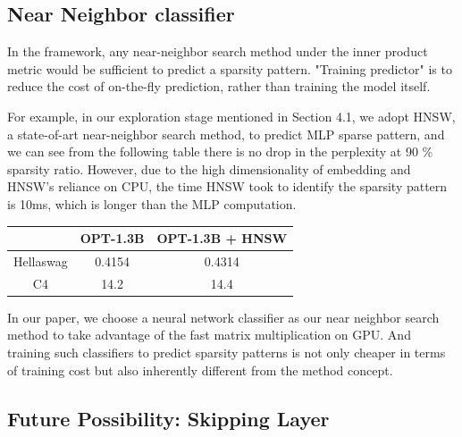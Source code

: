 \subsection{Near Neighbor classifier}
In the \name{} framework, any near-neighbor search method under the inner product metric would be sufficient to predict a sparsity pattern. "Training predictor" is to reduce the cost of on-the-fly prediction, rather than training the model itself.

For example, in our exploration stage mentioned in Section 4.1, we adopt HNSW, a state-of-art near-neighbor search method, to predict MLP sparse pattern, and we can see from the following table there is no drop in the perplexity at 90 \% sparsity ratio. However, due to the high dimensionality of embedding and HNSW’s reliance on CPU, the time HNSW took to identify the sparsity pattern is 10ms, which is longer than the MLP computation.

\begin{table}[h]
\centering
\begin{tabular}{ccc}
\hline
          & OPT-1.3B & OPT-1.3B + HNSW \\
\hline
Hellaswag & 0.4154   & 0.4314          \\
C4        & 14.2     & 14.4           \\
\hline
\end{tabular}
\end{table}
In our paper, we choose a neural network classifier as our near neighbor search method to take advantage of the fast matrix multiplication on GPU. And training such classifiers to predict sparsity patterns is not only cheaper in terms of training cost but also inherently different from the method concept.
\subsection{Future Possibility: Skipping Layer}
\label{sec:exp_skip_layer}


